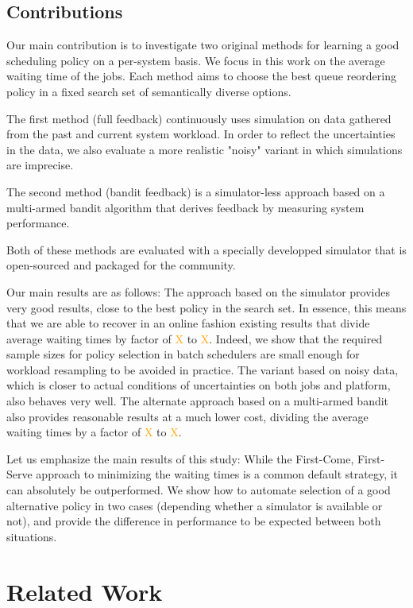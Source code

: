 \documentclass[sigconf,review]{acmart}
\begin{document}
\subsection{Contributions}

Our main contribution is to investigate two original methods for learning a
good scheduling policy on a per-system basis. We focus in this work on the
average waiting time of the jobs. Each method aims to choose the best queue
reordering policy in a fixed search set of semantically diverse options.

The first method (full feedback) continuously uses simulation on data gathered
from the past and current system workload. In order to reflect the
uncertainties in the data, we also evaluate a more realistic "noisy" variant in
which simulations are imprecise.

The second method (bandit feedback) is a simulator-less approach based on a
multi-armed bandit algorithm that derives feedback by measuring system
performance.

Both of these methods are evaluated with a specially developped simulator that is
open-sourced and packaged for the community.

\bigskip

Our main results are as follows: The approach based on the simulator provides
very good results, close to the best policy in the search set. In essence, this
means that we are able to recover in an online fashion existing results that
divide average waiting times by factor of \textcolor{orange}{X} to
\textcolor{orange}{X}. Indeed, we show that the required sample sizes for
policy selection in batch schedulers are small enough for workload resampling to
be avoided in practice. The variant based on noisy data, which is closer to
actual conditions of uncertainties on both jobs and platform, also behaves very
well. The alternate approach based on a multi-armed bandit also provides
reasonable results at a much lower cost, dividing the average waiting times by
a factor of \textcolor{orange}{X} to \textcolor{orange}{X}.

Let us emphasize the main results of this study: While the First-Come,
First-Serve approach to minimizing the waiting times is a common default
strategy, it can absolutely be outperformed.  We show how to automate selection
of a good alternative policy in two cases (depending whether a simulator is
available or not), and provide the difference in performance to be expected
between both situations.

\section{Related Work}
\label{sec:rw}
\end{document}
